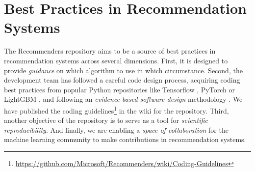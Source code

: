 \section{Best Practices in Recommendation Systems}

The Recommenders repository aims to be a source of best practices in recommendation systems
across several dimensions. First, it is designed to provide {\em guidance} on 
which algorithm to use in which circumstance. 
Second, the development team has followed a careful code design process, acquiring 
coding best practices from popular Python repositories like Tensorflow 
\cite{abadi2016tensorflow}, PyTorch \cite{paszke2017automatic} or LightGBM 
\cite{ke2017lightgbm}, and following an {\em evidence-based software design} methodology 
\cite{joeglekar2018evidence}. We have published the coding 
guidelines\footnote{\url{https://github.com/Microsoft/Recommenders/wiki/Coding-Guidelines}\label{foot_code_guidelines}} 
in the wiki for the repository. 
Third, another objective of the repository
is to serve as a tool for {\em scientific reproducibility}. And finally, we are enabling a 
{\em space of collaboration} for the machine learning community to make
contributions in recommendation systems.





